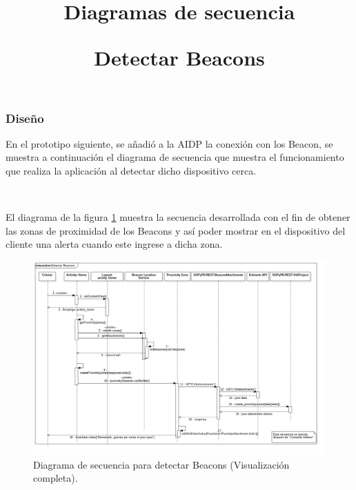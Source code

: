 \subsubsection{Diseño}
En el prototipo siguiente, se añadió a la AIDP la conexión con los Beacon, se muestra a continuación el diagrama de secuencia que muestra el funcionamiento que realiza la aplicación al detectar dicho dispositivo cerca. \\ \par
\title{\textbf{Diagramas de secuencia}\\ \par}
\title{\textbf{Detectar Beacons}}
\\ \par
El diagrama de la figura \ref{image:detecta} muestra la secuencia desarrollada con el fin de obtener las zonas de proximidad de los Beacons y así poder mostrar en el dispositivo del cliente una alerta cuando este ingrese a dicha zona.
\FloatBarrier
\begin{figure}[htbp!]
		\centering
			\includegraphics[width=1.1 \textwidth]{imagenes/Diagramas_UserApp/Nuevos_diagramas/detectarBeacons}
		\caption{Diagrama de secuencia para detectar Beacons (Visualización completa).}
		\label{image:detecta}
\end{figure}
\FloatBarrier


